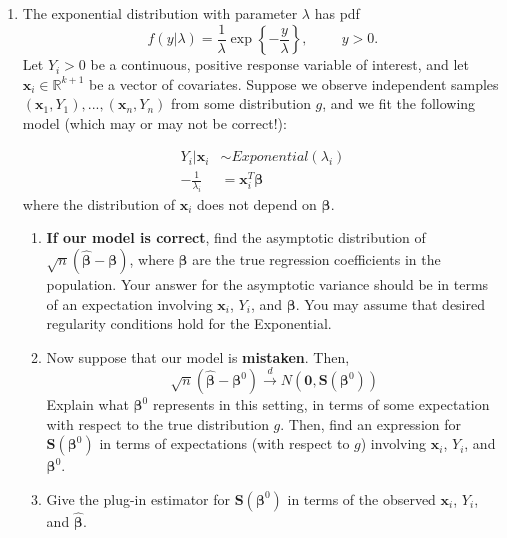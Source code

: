 \documentclass[11pt]{article}
\begin{document}
\begin{enumerate}
\begin{enumerate}
\item Let $\boldsymbol{\beta}^0$ be the value that solves $\mathbb{E}_g[\psi(Y_i, \mathbf{x}_i, \boldsymbol{\beta})] = \boldsymbol{0}$. Find the asymptotic distribution of $\sqrt{n}(\widehat{\boldsymbol{\beta}} - \boldsymbol{\beta}^0)$. The asymptotic variance should be in terms of $\boldsymbol{\beta}^0$, $\mathbf{x}_i$, and $Y_i$.

\item Give a plug-in estimator for $Var(\widehat{\boldsymbol{\beta}})$.
\end{enumerate}

\item The exponential distribution with parameter $\lambda$ has pdf
$$f(y | \lambda) = \frac{1}{\lambda} \exp\left\lbrace - \frac{y}{\lambda} \right\rbrace, \hspace{1cm} y > 0.$$
Let $Y_i > 0$ be a continuous, positive response variable of interest, and let $\mathbf{x}_i \in \mathbb{R}^{k+1}$ be a vector of covariates. Suppose we observe independent samples $(\mathbf{x}_1, Y_1),...,(\mathbf{x}_n, Y_n)$ from some distribution $g$, and we fit the following model (which may or may not be correct!):

\begin{align*}
Y_i|\mathbf{x}_i &\sim Exponential(\lambda_i) \\
-\frac{1}{\lambda_i} &= \mathbf{x}_i^T \boldsymbol{\beta}
\end{align*}
where the distribution of $\mathbf{x}_i$ does not depend on $\boldsymbol{\beta}$. 

\begin{enumerate}
\item \textbf{If our model is correct}, find the asymptotic distribution of $\sqrt{n}(\widehat{\boldsymbol{\beta}} - \boldsymbol{\beta})$, where $\boldsymbol{\beta}$ are the true regression coefficients in the population. Your answer for the asymptotic variance should be in terms of an expectation involving $\mathbf{x}_i$, $Y_i$, and $\boldsymbol{\beta}$. You may assume that desired regularity conditions hold for the Exponential.

\item Now suppose that our model is \textbf{mistaken}. Then, 
$$\sqrt{n}(\widehat{\boldsymbol{\beta}} - \boldsymbol{\beta}^0) \overset{d}{\to} N(\boldsymbol{0}, \mathbf{S}(\boldsymbol{\beta}^0))$$
Explain what $\boldsymbol{\beta}^0$ represents in this setting, in terms of some expectation with respect to the true distribution $g$. Then, find an expression for $\mathbf{S}(\boldsymbol{\beta}^0)$ in terms of expectations (with respect to $g$) involving $\mathbf{x}_i$, $Y_i$, and $\boldsymbol{\beta}^0$.

\item Give the plug-in estimator for $\mathbf{S}(\boldsymbol{\beta}^0)$ in terms of the observed $\mathbf{x}_i$, $Y_i$, and $\widehat{\boldsymbol{\beta}}$.
\end{enumerate}

\end{enumerate}
\end{document}
